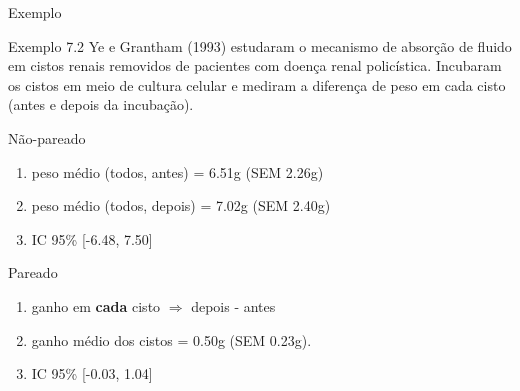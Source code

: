 \documentclass{beamer}
\begin{document}
\begin{frame}{Exemplo}
  \begin{exampleblock}{Exemplo 7.2}
    \footnotesize
    Ye e Grantham (1993) estudaram o mecanismo de absorção de fluido em cistos renais removidos de pacientes com doença renal policística.
    Incubaram os cistos em meio de cultura celular e mediram a diferença de peso em cada cisto (antes e depois da incubação).

    \scriptsize
    \begin{exampleblock}{Não-pareado}
      \begin{enumerate}
      \item<2,4> peso médio (todos, antes) = 6.51g (SEM 2.26g)
      \item<2,4> peso médio (todos, depois) = 7.02g (SEM 2.40g)
      \item<2,4> IC 95\% [-6.48, 7.50]
      \end{enumerate}
    \end{exampleblock}
    \begin{exampleblock}{Pareado}
      \begin{enumerate}
      \item<3,4> ganho em {\bf cada} cisto $\Rightarrow$ depois - antes
      \item<3,4> ganho médio dos cistos = 0.50g (SEM 0.23g).
      \item<3,4> IC 95\% [-0.03, 1.04]
      \end{enumerate}
    \end{exampleblock}
  \end{exampleblock}
\end{frame}
\end{document}

